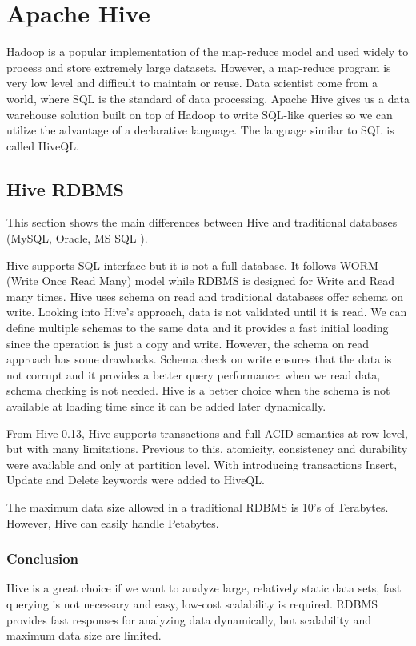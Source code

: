 \chapter{Apache Hive}
Hadoop is a popular implementation of the map-reduce model and used widely to process and store extremely large datasets. However, a map-reduce program is very low level and difficult to maintain or reuse. Data scientist come from a world, where SQL is the standard of data processing. Apache Hive gives us a data warehouse solution built on top of Hadoop to write SQL-like queries so we can utilize the advantage of a declarative language. The language similar to SQL is called HiveQL.

\section{Hive \vs RDBMS}
This section shows the main differences between Hive and traditional databases (\eg MySQL, Oracle, MS SQL \etc).

Hive supports SQL interface but it is not a full database. It follows WORM (Write Once Read Many) model while RDBMS is designed for Write and Read many times. Hive uses schema on read and traditional databases offer schema on write. Looking into Hive's approach, data is not validated until it is read. We can define multiple schemas to the same data and it provides a fast initial loading since the operation is just a copy and write. However, the schema on read approach has some drawbacks. Schema check on write ensures that the data is not corrupt and it provides a better query performance: when we read data, schema checking is not needed. Hive is a better choice when the schema is not available at loading time since it can be added later dynamically. 

From Hive 0.13, Hive supports transactions \cite{Hive-transactions} and full ACID semantics at row level, but with many limitations. Previous to this, atomicity, consistency and durability were available and only at partition level. With introducing transactions Insert, Update and Delete keywords were added to HiveQL. 

The maximum data size allowed in a traditional RDBMS is 10's of Terabytes. However, Hive can easily handle Petabytes.

\subsection{Conclusion}
Hive is a great choice if we want to analyze large, relatively static data sets, fast querying is not necessary and easy, low-cost scalability is required. RDBMS provides fast responses for analyzing data dynamically, but scalability and maximum data size are limited.


